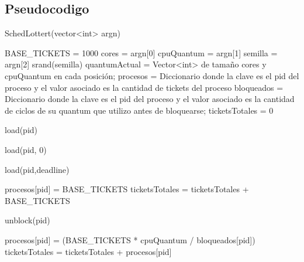 \subsection{Pseudocodigo}


\begin{algorithm}[H]
\caption{SchedLottert(vector<int> argn)}
\label{pseudo:SchedLottery}
\begin{algorithmic}

\STATE BASE\_TICKETS = 1000
\STATE cores = argn[0]
\STATE cpuQuantum = argn[1]
\STATE semilla = argn[2]
\STATE srand(semilla)
\STATE quantumActual = Vector<int> de tamaño cores y cpuQuantum en cada posición;
\STATE procesos = Diccionario donde la clave es el pid del proceso y el valor asociado es la cantidad de tickets del proceso
\STATE bloqueados = Diccionario donde la clave es el pid del proceso y el valor asociado es la cantidad de ciclos de su quantum que utilizo antes de bloquearse;
\STATE ticketsTotales = 0

\end{algorithmic}
\end{algorithm}


\begin{algorithm}[H]
\caption{load(pid)}
\label{pseudo:load}
\begin{algorithmic}

\STATE load(pid, 0)

\end{algorithmic}
\end{algorithm}


\begin{algorithm}[H]
\caption{load(pid,deadline)}
\label{pseudo:loadD}
\begin{algorithmic}

\STATE procesos[pid] = BASE\_TICKETS
\STATE ticketsTotales = ticketsTotales + BASE\_TICKETS

\end{algorithmic}
\end{algorithm}



\begin{algorithm}[H]
\caption{unblock(pid)}
\label{pseudo:unblock}
\begin{algorithmic}

\STATE procesos[pid] = (BASE\_TICKETS * cpuQuantum / bloqueados[pid])
\STATE ticketsTotales = ticketsTotales + procesos[pid]

\end{algorithmic}
\end{algorithm}



